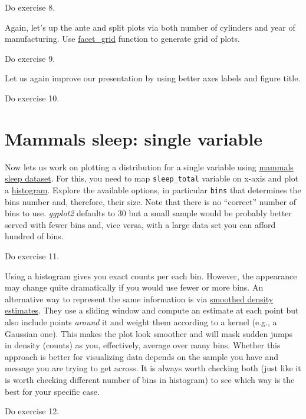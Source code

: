 \documentclass[
]{book}
\begin{document}
Do exercise 8.

Again, let's up the ante and split plots via both number of cylinders and year of manufacturing. Use \href{https://ggplot2.tidyverse.org/reference/facet_grid.html}{facet\_grid} function to generate grid of plots.

Do exercise 9.

Let us again improve our presentation by using better axes labels and figure title.

Do exercise 10.

\hypertarget{mammals-sleep-single-variable}{%
\section{Mammals sleep: single variable}\label{mammals-sleep-single-variable}}

Now lets us work on plotting a distribution for a single variable using \href{https://ggplot2.tidyverse.org/reference/msleep.html}{mammals sleep dataset}. For this, you need to map \texttt{sleep\_total} variable on x-axis and plot a \href{https://ggplot2.tidyverse.org/reference/geom_histogram.html}{histogram}. Explore the available options, in particular \texttt{bins} that determines the bins number and, therefore, their size. Note that there is no ``correct'' number of bins to use. \emph{ggplot2} defaults to 30 but a small sample would be probably better served with fewer bins and, vice versa, with a large data set you can afford hundred of bins.

Do exercise 11.

Using a histogram gives you exact counts per each bin. However, the appearance may change quite dramatically if you would use fewer or more bins. An alternative way to represent the same information is via \href{https://ggplot2.tidyverse.org/reference/geom_density.html}{smoothed density estimates}. They use a sliding window and compute an estimate at each point but also include points \emph{around} it and weight them according to a kernel (e.g., a Gaussian one). This makes the plot look smoother and will mask sudden jumps in density (counts) as you, effectively, average over many bins. Whether this approach is better for visualizing data depends on the sample you have and message you are trying to get across. It is always worth checking both (just like it is worth checking different number of bins in histogram) to see which way is the best for your specific case.

Do exercise 12.
\end{document}
